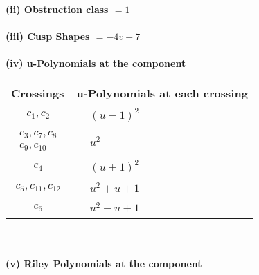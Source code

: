 \documentclass[1p]{elsarticle_modified}
\theoremstyle{definition}
\begin{document}
\flushleft \textbf{(ii) Obstruction class $= 1$}\\~\\
\flushleft \textbf{(iii) Cusp Shapes $= -4 v-7$}\\~\\
\newpage\renewcommand{\arraystretch}{1}
\flushleft \textbf{(iv) u-Polynomials at the component}\newline \\
\begin{tabular}{m{50pt}|m{274pt}}
Crossings & \hspace{64pt}u-Polynomials at each crossing \\
\hline $$\begin{aligned}c_{1},c_{2}\end{aligned}$$&$\begin{aligned}
&(u-1)^2
\end{aligned}$\\
\hline $$\begin{aligned}c_{3},c_{7},c_{8}\\c_{9},c_{10}\end{aligned}$$&$\begin{aligned}
&u^2
\end{aligned}$\\
\hline $$\begin{aligned}c_{4}\end{aligned}$$&$\begin{aligned}
&(u+1)^2
\end{aligned}$\\
\hline $$\begin{aligned}c_{5},c_{11},c_{12}\end{aligned}$$&$\begin{aligned}
&u^2+u+1
\end{aligned}$\\
\hline $$\begin{aligned}c_{6}\end{aligned}$$&$\begin{aligned}
&u^2- u+1
\end{aligned}$\\
\hline
\end{tabular}\\~\\
\newpage\renewcommand{\arraystretch}{1}
\flushleft \textbf{(v) Riley Polynomials at the component}\newline \\
\end{document}
